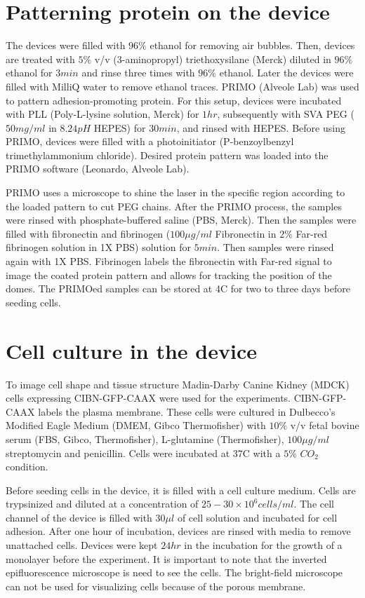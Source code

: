 \section{Patterning protein on the device}
The devices were filled with $96\%$ ethanol for removing air bubbles. Then, devices are treated with $5\%$ v/v (3-aminopropyl) triethoxysilane (Merck) diluted in $96\%$ ethanol for $3min$ and rinse three times with $96\%$ ethanol. Later the devices were filled with MilliQ water to remove ethanol traces. PRIMO (Alveole Lab) was used to pattern adhesion-promoting protein. For this setup, devices were incubated with PLL (Poly-L-lysine solution, Merck) for $1hr$, subsequently with SVA PEG ($50mg/ml$ in $8.24pH$ HEPES) for $30min$, and rinsed with HEPES. Before using PRIMO, devices were filled with a photoinitiator (P-benzoylbenzyl trimethylammonium chloride). Desired protein pattern was loaded into the PRIMO software (Leonardo, Alveole Lab). 

PRIMO uses a microscope to shine the laser in the specific region according to the loaded pattern to cut PEG chains. After the PRIMO process, the samples were rinsed with phosphate-buffered saline (PBS, Merck). Then the samples were filled with fibronectin and fibrinogen ($100\mu g/ml$ Fibronectin in $2\%$ Far-red fibrinogen solution in 1X PBS) solution for $5 min$. Then samples were rinsed again with 1X PBS. Fibrinogen labels the fibronectin with Far-red signal to image the coated protein pattern and allows for tracking the position of the domes. The PRIMOed samples can be stored at 4\textdegree{}C for two to three days before seeding cells.

\section{Cell culture in the device}

To image cell shape and tissue structure Madin-Darby Canine Kidney (MDCK) cells expressing CIBN-GFP-CAAX were used for the experiments. CIBN-GFP-CAAX labels the plasma membrane. These cells were cultured in Dulbecco’s Modified Eagle Medium (DMEM, Gibco Thermofisher) with $10\%$ v/v fetal bovine serum (FBS, Gibco, Thermofisher), L-glutamine (Thermofisher), $100\mu g/ml$ streptomycin and penicillin. Cells were incubated at  37\textdegree{}C with a $5\%$ $CO_2$ condition. 

Before seeding cells in the device, it is filled with a cell culture medium. Cells are trypsinized and diluted at a concentration of $25-30\times10^6 cells/ml$. The cell channel of the device is filled with $30\mu l$ of cell solution and incubated for cell adhesion. After one hour of incubation, devices are rinsed with media to remove unattached cells. Devices were kept $24hr$ in the incubation for the growth of a monolayer before the experiment. It is important to note that the inverted epifluorescence microscope is need to see the cells. The bright-field microscope can not be used for visualizing cells because of the porous membrane.

